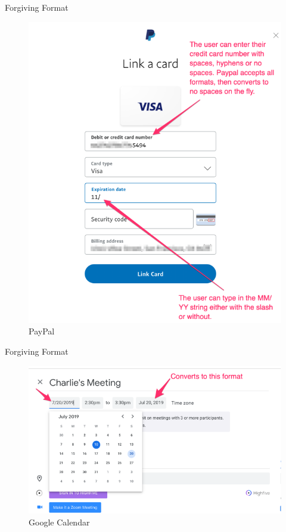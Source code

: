 \documentclass{beamer}
\begin{document}
\begin{frame}[t]{Forgiving Format}
	\begin{figure}[h]
		\centering
		\includegraphics[scale=0.6]{images/lec08-pic33.png}
		\caption{PayPal}
	\end{figure}
\end{frame}

\begin{frame}[t]{Forgiving Format}
	\begin{figure}[h]
		\centering
		\includegraphics[scale=0.6]{images/lec08-pic34.png}
		\caption{Google Calendar}
	\end{figure}
\end{frame}
\end{document}
